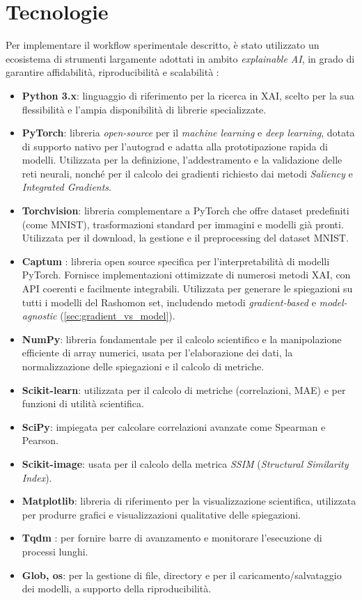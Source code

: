 \documentclass[12pt,a4paper,oneside]{report}
\numberwithin{figure}{chapter}
\numberwithin{table}{chapter}
\begin{document}
\section{Tecnologie}
Per implementare il workflow sperimentale descritto, è stato utilizzato un
ecosistema di strumenti largamente adottati in ambito \emph{explainable AI}, in
grado di garantire affidabilità, riproducibilità e scalabilità
\citep{adadi2018survey,mueller2023rashomon}:

\begin{itemize}
      \item \textbf{Python 3.x}: linguaggio di riferimento per la ricerca in XAI, scelto per la sua flessibilità e l’ampia disponibilità di librerie specializzate.
      \item \textbf{PyTorch}: libreria \emph{open-source} per il \emph{machine learning} e \emph{deep learning}, dotata di supporto nativo per l’autograd e adatta alla prototipazione rapida di modelli. Utilizzata per la definizione, l’addestramento e la validazione delle reti neurali, nonché per il calcolo dei gradienti richiesto dai metodi \emph{Saliency} e \emph{Integrated Gradients}.
      \item \textbf{Torchvision}: libreria complementare a PyTorch che offre dataset predefiniti (come MNIST), trasformazioni standard per immagini e modelli già pronti. Utilizzata per il download, la gestione e il preprocessing del dataset MNIST.
      \item \textbf{Captum} \citep{kokhlikyan2020captum}: libreria open source specifica per l’interpretabilità di modelli PyTorch. Fornisce implementazioni ottimizzate di numerosi metodi XAI, con API coerenti e facilmente integrabili. Utilizzata per generare le spiegazioni su tutti i modelli del Rashomon set, includendo metodi \emph{gradient-based} e \emph{model-agnostic} (\autoref{sec:gradient_vs_model}).
      \item \textbf{NumPy}: libreria fondamentale per il calcolo scientifico e la manipolazione efficiente di array numerici, usata per l’elaborazione dei dati, la normalizzazione delle spiegazioni e il calcolo di metriche.
      \item \textbf{Scikit-learn}: utilizzata per il calcolo di metriche (correlazioni, MAE) e per funzioni di utilità scientifica.
      \item \textbf{SciPy}: impiegata per calcolare correlazioni avanzate come Spearman e Pearson.
      \item \textbf{Scikit-image}: usata per il calcolo della metrica \emph{SSIM} (\emph{Structural Similarity Index}).
      \item \textbf{Matplotlib}: libreria di riferimento per la visualizzazione scientifica, utilizzata per produrre grafici e visualizzazioni qualitative delle spiegazioni.
      \item \textbf{Tqdm} \citep{tqdm}: per fornire barre di avanzamento e monitorare l’esecuzione di processi lunghi.
      \item \textbf{Glob, os}: per la gestione di file, directory e per il caricamento/salvataggio dei modelli, a supporto della riproducibilità.
\end{itemize}
\end{document}
